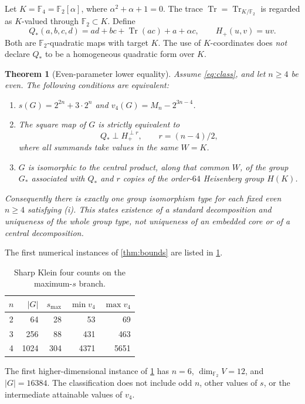 \documentclass[11pt,a4paper]{article}
\newtheorem{theorem}{Theorem}[section]
\theoremstyle{definition}
\theoremstyle{remark}
\numberwithin{equation}{section}
\newcommand{\F}{\mathbb F}
\newcommand{\Tr}{\operatorname{Tr}}
\newcommand{\vfour}{v_4}
\newcommand{\Qstar}{Q_*}
\newcommand{\Hp}{H_+}
\begin{document}
Let \(K=\F_4=\F_2[\alpha]\), where \(\alpha^2+\alpha+1=0\).
The trace \(\Tr=\Tr_{K/\F_2}\) is regarded as \(K\)-valued through
\(\F_2\subset K\). Define
\begin{equation}\label{eq:representatives}
 \Qstar(a,b,c,d)=ad+bc+\Tr(ac)+a+\alpha c,\qquad
 \Hp(u,v)=uv.
\end{equation}
Both are \(\F_2\)-quadratic maps with target \(K\).
The use of \(K\)-coordinates does \emph{not} declare \(\Qstar\) to be a
homogeneous quadratic form over \(K\).

\begin{theorem}[Even-parameter lower equality]\label{thm:classification}
Assume \eqref{eq:class}, and let \(n\geq4\) be even.
The following conditions are equivalent:
\begin{enumerate}[label=(\roman*)]
\item \(s(G)=2^{2n}+3\cdot2^n\) and
      \(\vfour(G)=M_n-2^{3n-4}\).
\item The square map of \(G\) is strictly equivalent to
\[
 \Qstar\perp \Hp^{\perp r},\qquad r=(n-4)/2,
\]
where all summands take values in the same \(W=K\).
\item \(G\) is isomorphic to the central product, along that common \(W\),
of the group \(G_*\) associated with \(\Qstar\) and \(r\) copies of the
order-\(64\) Heisenberg group \(H(K)\).
\end{enumerate}
Consequently there is exactly one group isomorphism type for each
fixed even \(n\geq4\) satisfying (i).
This states existence of a standard decomposition and uniqueness of the
whole group type, not uniqueness of an embedded core or of a central
decomposition.
\end{theorem}

The first numerical instances of \cref{thm:bounds} are listed in
\cref{tab:small}.
\begin{table}[htb]
\centering
\caption{Sharp Klein four counts on the maximum-\(s\) branch.}
\label{tab:small}
\begin{tabular}{crrrr}
\toprule
\(n\)&\(|G|\)&\(s_{\max}\)&\(\min\vfour\)&\(\max\vfour\)\\
\midrule
2&64&28&53&69\\
3&256&88&431&463\\
4&1024&304&4371&5651\\
\bottomrule
\end{tabular}
\end{table}
The first higher-dimensional instance of \cref{thm:classification}
has \(n=6\), \(\dim_{\F_2}V=12\), and \(|G|=16384\).
The classification does not include odd \(n\), other values of \(s\),
or the intermediate attainable values of \(\vfour\).
\end{document}
